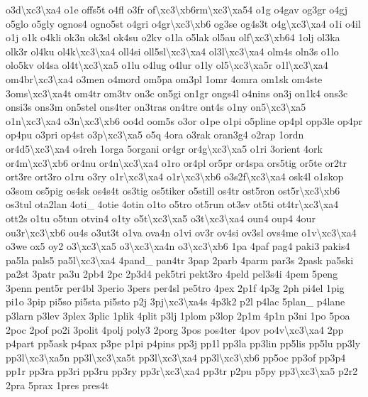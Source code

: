 {o3d\textbackslash{}xc3\textbackslash{}xa4 o1e offs5t o4fl o3fr of\textbackslash{}xc3\textbackslash{}xb6rm\textbackslash{}xc3\textbackslash{}xa54 o1g o4gav og3gr o4gj o5glo o5gly ognos4 ogno5st o4gri o4gr\textbackslash{}xc3\textbackslash{}xb6 og3se og4s3t o4g\textbackslash{}xc3\textbackslash{}xa4 o1i o4il o1j o1k o4kli ok3n ok3sl ok4su o2kv o1la o5lak ol5au olf\textbackslash{}xc3\textbackslash{}xb64 1olj ol3ka olk3r ol4ku ol4k\textbackslash{}xc3\textbackslash{}xa4 oll4si oll5sl\textbackslash{}xc3\textbackslash{}xa4 ol3l\textbackslash{}xc3\textbackslash{}xa4 olm4s oln3s o1lo olo5kv ol4sa ol4t\textbackslash{}xc3\textbackslash{}xa5 o1lu o4lug o4lur o1ly ol5\textbackslash{}xc3\textbackslash{}xa5r o1l\textbackslash{}xc3\textbackslash{}xa4 om4br\textbackslash{}xc3\textbackslash{}xa4 o3men o4mord om5pa om3pl 1omr 4omra om1sk om4ste 3oms\textbackslash{}xc3\textbackslash{}xa4t om4tr om3tv on3c on5gi on1gr ongs4l o4nins on3j on1k4 ons3c onsi3s ons3m on5stel ons4ter on3tras on4tre ont4s o1ny on5\textbackslash{}xc3\textbackslash{}xa5 o1n\textbackslash{}xc3\textbackslash{}xa4 o3n\textbackslash{}xc3\textbackslash{}xb6 oo4d oom5s o3or o1pe o1pi o5pline op4pl opp3le op4pr op4pu o3pri op4st o3p\textbackslash{}xc3\textbackslash{}xa5 o5q 4ora o3rak oran3g4 o2rap 1ordn or4d5\textbackslash{}xc3\textbackslash{}xa4 o4reh 1orga 5organi or4gr or4g\textbackslash{}xc3\textbackslash{}xa5 o1ri 3orient 4ork or4m\textbackslash{}xc3\textbackslash{}xb6 or4nu or4n\textbackslash{}xc3\textbackslash{}xa4 o1ro or4pl or5pr or4spa ors5tig or5te or2tr ort3re ort3ro o1ru o3ry o1r\textbackslash{}xc3\textbackslash{}xa4 o1r\textbackslash{}xc3\textbackslash{}xb6 o3s2f\textbackslash{}xc3\textbackslash{}xa4 osk4l o1skop o3som os5pig os4sk os4s4t os3tig os5tiker o5still os4tr ost5ron ost5r\textbackslash{}xc3\textbackslash{}xb6 os3tul ota2lan 4oti\-\_\- 4otie 4otin o1to o5tro ot5run ot3sv ot5ti ot4tr\textbackslash{}xc3\textbackslash{}xa4 ott2s o1tu o5tun otvin4 o1ty o5t\textbackslash{}xc3\textbackslash{}xa5 o3t\textbackslash{}xc3\textbackslash{}xa4 oun4 oup4 4our ou3r\textbackslash{}xc3\textbackslash{}xb6 ou4s o3ut3t o1va ova4n o1vi ov3r ov4si ov3sl ovs4me o1v\textbackslash{}xc3\textbackslash{}xa4 o3we ox5 oy2 o3\textbackslash{}xc3\textbackslash{}xa5 o3\textbackslash{}xc3\textbackslash{}xa4n o3\textbackslash{}xc3\textbackslash{}xb6 1pa 4paf pag4 paki3 pakis4 pa5la pals5 pa5l\textbackslash{}xc3\textbackslash{}xa4 4pand\-\_\- pan4tr 3pap 2parb 4parm par3s 2pask pa5ski pa2st 3patr pa3u 2pb4 2pc 2p3d4 pek5tri pekt3ro 4peld pel3s4i 4pem 5peng 3penn pent5r per4bl 3perio 3pers per4sl pe5tro 4pex 2p1f 4p3g 2ph pi4el 1pig pi1o 3pip pi5so pi5sta pi5sto p2j 3pj\textbackslash{}xc3\textbackslash{}xa4s 4p3k2 p2l p4lac 5plan\-\_\- p4lane p3larn p3lev 3plex 3plic 1plik 4plit p3lj 1plom p3lop 2p1m 4p1n p3ni 1po 5poa 2poc 2pof po2i 3polit 4polj poly3 2porg 3pos pos4ter 4pov po4v\textbackslash{}xc3\textbackslash{}xa4 2pp p4part pp5ask p4pax p3pe p1pi p4pins pp3j pp1l pp3la pp3lin pp5lis pp5lu pp3ly pp3l\textbackslash{}xc3\textbackslash{}xa5n pp3l\textbackslash{}xc3\textbackslash{}xa5t pp3l\textbackslash{}xc3\textbackslash{}xa4 pp3l\textbackslash{}xc3\textbackslash{}xb6 pp5oc pp3of pp3p4 pp1r pp3ra pp3ri pp3ru pp3ry pp3r\textbackslash{}xc3\textbackslash{}xa4 pp3tr p2pu p5py pp3\textbackslash{}xc3\textbackslash{}xa5 p2r2 2pra 5prax 1pres pres4t }
